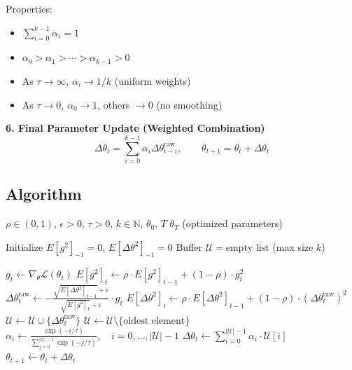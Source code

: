 \documentclass[11pt,a4paper]{article}
\begin{document}
Properties:
\begin{itemize}
    \item $\sum_{i=0}^{k-1} \alpha_i = 1$
    \item $\alpha_0 > \alpha_1 > \cdots > \alpha_{k-1} > 0$
    \item As $\tau \rightarrow \infty$, $\alpha_i \rightarrow 1/k$ (uniform weights)
    \item As $\tau \rightarrow 0$, $\alpha_0 \rightarrow 1$, others $\rightarrow 0$ (no smoothing)
\end{itemize}

\textbf{6. Final Parameter Update (Weighted Combination)}
\begin{equation}
\Delta\theta_t = \sum_{i=0}^{k-1} \alpha_i \Delta\theta_{t-i}^{\text{raw}}, \qquad \theta_{t+1} = \theta_t + \Delta\theta_t
\end{equation}

\subsection{Algorithm}

\begin{algorithm}[H]
\caption{LW-AdaDelta (Local Window AdaDelta)}
\begin{algorithmic}[1]
\REQUIRE $\rho \in (0,1)$, $\epsilon > 0$, $\tau > 0$, $k \in \mathbb{N}$, $\theta_0$, $T$
\ENSURE $\theta_T$ (optimized parameters)

\STATE Initialize $E[g^2]_{-1} = 0$, $E[\Delta\theta^2]_{-1} = 0$
\STATE Buffer $\mathcal{U} = \text{empty list}$ (max size $k$)

    \STATE $g_t \leftarrow \nabla_\theta \mathcal{L}(\theta_t)$
    \STATE $E[g^2]_t \leftarrow \rho \cdot E[g^2]_{t-1} + (1-\rho) \cdot g_t^2$
    \STATE $\Delta\theta_t^{\text{raw}} \leftarrow - \frac{\sqrt{E[\Delta\theta^2]_{t-1}} + \epsilon}{\sqrt{E[g^2]_t} + \epsilon} \cdot g_t$
    \STATE $E[\Delta\theta^2]_t \leftarrow \rho \cdot E[\Delta\theta^2]_{t-1} + (1-\rho) \cdot (\Delta\theta_t^{\text{raw}})^2$
    \STATE $\mathcal{U} \leftarrow \mathcal{U} \cup \{\Delta\theta_t^{\text{raw}}\}$
        \STATE $\mathcal{U} \leftarrow \mathcal{U} \setminus \{\text{oldest element}\}$
    \ENDIF
    \STATE $\alpha_i \leftarrow \frac{\exp(-i/\tau)}{\sum_{j=0}^{|\mathcal{U}|-1} \exp(-j/\tau)}, \quad i = 0,\ldots,|\mathcal{U}|-1$
    \STATE $\Delta\theta_t \leftarrow \sum_{i=0}^{|\mathcal{U}|-1} \alpha_i \cdot \mathcal{U}[i]$
    \STATE $\theta_{t+1} \leftarrow \theta_t + \Delta\theta_t$
\ENDFOR
\end{algorithmic}
\end{algorithm}
\end{document}
